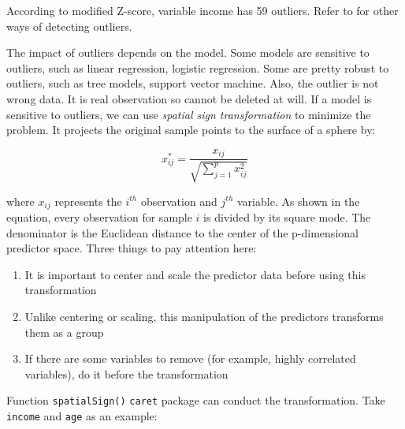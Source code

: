 \documentclass[12pt,]{krantz}
\providecommand{\tightlist}{%
  \setlength{\itemsep}{0pt}\setlength{\parskip}{0pt}}
\begin{document}
According to modified Z-score, variable income has 59 outliers. Refer to \citep{mad1} for other ways of detecting outliers.

The impact of outliers depends on the model. Some models are sensitive to outliers, such as linear regression, logistic regression. Some are pretty robust to outliers, such as tree models, support vector machine. Also, the outlier is not wrong data. It is real observation so cannot be deleted at will. If a model is sensitive to outliers, we can use \emph{spatial sign transformation} \citep{ssp} to minimize the problem. It projects the original sample points to the surface of a sphere by:

\[x_{ij}^{*}=\frac{x_{ij}}{\sqrt{\sum_{j=1}^{p}x_{ij}^{2}}}\]

where \(x_{ij}\) represents the \(i^{th}\) observation and \(j^{th}\) variable. As shown in the equation, every observation for sample \(i\) is divided by its square mode. The denominator is the Euclidean distance to the center of the p-dimensional predictor space. Three things to pay attention here:

\begin{enumerate}
\def\labelenumi{\arabic{enumi}.}
\tightlist
\item
  It is important to center and scale the predictor data before using this transformation
\item
  Unlike centering or scaling, this manipulation of the predictors transforms them as a group
\item
  If there are some variables to remove (for example, highly correlated variables), do it before the transformation
\end{enumerate}

Function \texttt{spatialSign()} \texttt{caret} package can conduct the transformation. Take \texttt{income} and \texttt{age} as an example:
\end{document}
